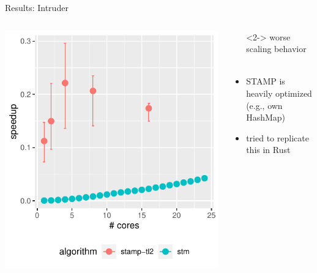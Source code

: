 \documentclass[aspectratio=169, usenames, dvipsnames]{beamer}
\newcommand{\xmark}{\ding{55}}%
\newcommand{\nope}{\rlap{$\square$}{\large\hspace{1pt}\xmark}%
\hspace{-2.5pt}}
\begin{document}
\begin{frame}{Results: Intruder}
    \begin{columns}%
        \begin{column}{0.5\textwidth}
            \centering
            \includegraphics[width=\textwidth,height=.65\textheight,keepaspectratio]{img/combined_plots/intruder+}
        \end{column}%
        \begin{column}{0.5\textwidth}
            \begin{itemize}
                \item[\nope]<2-> worse scaling behavior\\ \
            \end{itemize}

            \begin{itemize}
                \item<3-> STAMP is heavily optimized \\ (e.g., own HashMap)
                \item<4-> tried to replicate this in Rust
            \end{itemize}
        \end{column}
    \end{columns}
\end{frame}
\end{document}

